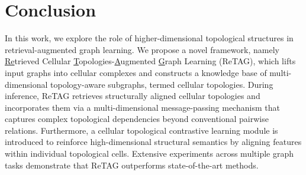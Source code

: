 \section{Conclusion}
In this work, we explore the role of higher-dimensional topological structures in retrieval-augmented graph learning. We propose a novel framework, namely \underline{Re}trieved Cellular \underline{T}opologies-\underline{A}ugmented \underline{G}raph Learning (ReTAG), which lifts input graphs into cellular complexes and constructs a knowledge base of multi-dimensional topology-aware subgraphs, termed cellular topologies. During inference, ReTAG retrieves structurally aligned cellular topologies and incorporates them via a multi-dimensional message-passing mechanism that captures complex topological dependencies beyond conventional pairwise relations. Furthermore, a cellular topological contrastive learning module is introduced to reinforce high-dimensional structural semantics by aligning features within individual topological cells. Extensive experiments across multiple graph tasks demonstrate that ReTAG outperforms state-of-the-art methods.